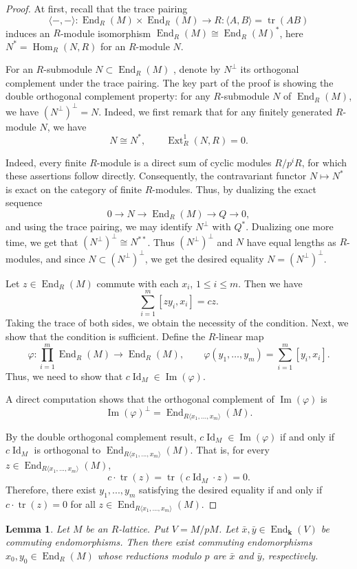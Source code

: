 \documentclass[12pt,letterpaper]{amsart}
\theoremstyle{plain}
\newtheorem{lemma}{Lemma}[section]
\theoremstyle{definition}
\DeclareMathOperator{\tr}{tr}
\DeclareMathOperator{\End}{End}
\DeclareMathOperator{\Ima}{Im}
\DeclareMathOperator{\Id}{Id}
\begin{document}
\begin{proof}
At first, recall that the trace pairing  
$$\langle -, -\rangle: \End_R(M)\times \End_R(M)\to R: \langle A, B\rangle=\tr(AB)$$ 
induces an $R$-module isomorphism 
$\End_R(M)\cong \End_R(M)^*$, here $N^*=\operatorname{Hom}_R(N, R)$  for an $R$-module $N$. 

For an $R$-submodule $N\subset \End_R(M)$ , denote by $N^{\perp}$ its orthogonal complement under the trace pairing.
The key part of the proof is showing the double orthogonal complement property: for any $R$-submodule $N$ of $\End_R(M)$,  we have
$(N^{\perp})^\perp=N$. Indeed, we first remark that for any finitely generated $R$-module $N$,  we have
$$N\cong N^*,\qquad \operatorname{Ext}^1_R(N,R)=0.$$

Indeed, every finite $R$-module is a direct sum of cyclic modules $R/p^iR$, for which these assertions follow directly.
Consequently, the contravariant functor $N\mapsto N^*$ is exact on the category of finite $R$-modules.
Thus, by dualizing the exact sequence 
$$0\to N \to \End_R(M)\to Q\to 0,$$  and using the trace pairing, we
may identify $N^{\perp}$ with $Q^*$. Dualizing one more time, we get that
 $(N^{\perp})^{\perp}\cong N^{**}$. Thus  $(N^{\perp})^{\perp}$ and $N$ have equal lengths as $R$-modules, and since
 $N\subset (N^{\perp})^{\perp}$, we get the desired equality $N=(N^{\perp})^{\perp}$.

Let $z\in \End_R(M)$ commute with each $x_i$, $1\leq i\leq m$. Then we have
\[
\sum_{i=1}^m[zy_i,x_i]=cz.
\]
Taking the trace of both sides, we obtain the necessity of the condition.
Next, we show that the condition is sufficient.
Define the $R$-linear map
\[
\varphi : \prod_{i=1}^m\End_R(M) \longrightarrow \End_R(M), \qquad \varphi(y_1,\dots,y_m) = \sum_{i=1}^m[y_i, x_i].
\]
Thus, we need to show that $c \Id_M \in \Ima(\varphi)$.

A direct computation shows that the orthogonal complement of $\Ima(\varphi)$ is
\[
\Ima(\varphi)^\perp=\End_{R\langle x_1,\ldots,x_m\rangle}(M).
\]

By the double orthogonal complement result, $c \Id_M \in \Ima(\varphi)$ if and only if $c \Id_M$ is orthogonal to $\End_{R\langle x_1,...,x_m\rangle}(M)$. That is, for every $z\in \End_{R\langle x_1,...,x_m\rangle}(M)$,
\[
c \cdot \tr(z)=\tr(c \Id_M \cdot z) = 0.
\]
Therefore, there exist $y_1,...,y_m$ satisfying the desired equality if and only if $c \cdot \tr(z) = 0$ for all $z \in \End_{R\langle x_1,...,x_m\rangle}(M)$.
\end{proof}
\begin{lemma}\label{lem:commuting-lifts}
Let $M$ be an $R$-lattice. Put $V=M/pM$. 
Let $\bar x,\bar y\in\operatorname{End}_{\mathbf{k}}(V)$ be commuting endomorphisms. 
Then there exist commuting endomorphisms $x_0,y_0\in\End_R(M)$ whose reductions modulo $p$ are $\bar x$ and $\bar y$, respectively.
\end{lemma}
\end{document}
